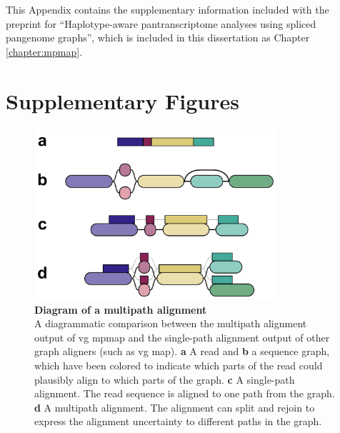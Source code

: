 \documentclass[11pt]{ucthesis}
\begin{document}
This Appendix contains the supplementary information included with the preprint for ``Haplotype-aware pantranscriptome analyses using spliced pangenome graphs'', which is included in this dissertation as Chapter \ref{chapter:mpmap}.

\section{Supplementary Figures}

\begin{figure}[H]
\ssp
\begin{center}
\includegraphics[width=0.8\textwidth]{mpmapfigures/figureS10.pdf}
\caption{\textbf{Diagram of a multipath alignment} \\
A diagrammatic comparison between the multipath alignment output of vg mpmap and the single-path alignment output of other graph aligners (such as vg map). \textbf{a} A read and \textbf{b} a sequence graph, which have been colored to indicate which parts of the read could plausibly align to which parts of the graph. \textbf{c} A single-path alignment. The read sequence is aligned to one path from the graph. \textbf{d} A multipath alignment. The alignment can split and rejoin to express the alignment uncertainty to different paths in the graph.
} \label{fig:multipath-alignment}
\end{center}
\end{figure}
\end{document}
